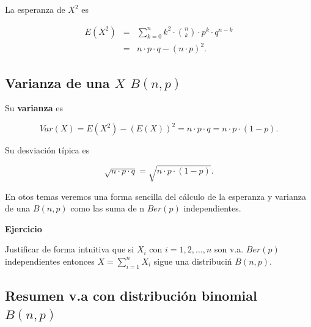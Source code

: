 \documentclass[]{book}
\begin{document}
La esperanza de \(X^2\) es

\[
\begin{eqnarray*}
E(X^2)&=& \displaystyle\sum_{k=0}^n k^2 \cdot  {n \choose k }\cdot p^k\cdot q^{n-k}\\
&=& n\cdot p\cdot q-(n\cdot p)^2.
\end{eqnarray*}
\]

\hypertarget{varianza-de-una-x-bnp}{%
\subsection{\texorpdfstring{Varianza de una \(X\) \(B(n,p)\)}{Varianza de una X B(n,p)}}\label{varianza-de-una-x-bnp}}

Su \textbf{varianza} es

\[Var(X)=E(X^2)-\left(E(X)\right)^2=n\cdot p \cdot q=n\cdot p\cdot (1-p).\]

Su desviación típica es

\[\sqrt{n\cdot p\cdot q}=\sqrt{n\cdot p\cdot (1-p)}.\]

En otos temas veremos una forma sencilla del cálculo de la esperanza y varianza de una \(B(n,p)\) como las suma de n \(Ber(p)\) independientes.

\textbf{Ejercicio}

Justificar de forma intuitiva que si \(X_i\) con \(i=1,2,\ldots, n\) son v.a. \(Ber(p)\) independientes entonces \(X=\displaystyle\sum_{i=1}^n X_i\) sigue una distribuciń \(B(n,p).\)

\hypertarget{resumen-v.a-con-distribuciuxf3n-binomial-bnp}{%
\subsection{\texorpdfstring{Resumen v.a con distribución binomial \(B(n,p)\)}{Resumen v.a con distribución binomial B(n,p)}}\label{resumen-v.a-con-distribuciuxf3n-binomial-bnp}}
\end{document}
